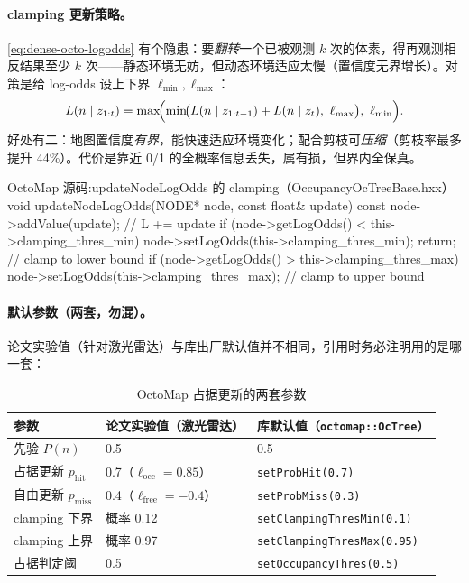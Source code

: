 \paragraph{clamping 更新策略。}
\cref{eq:dense-octo-logodds} 有个隐患：要\emph{翻转}一个已被观测 $k$ 次的体素，得再观测相反结果至少 $k$ 次——静态环境无妨，但动态环境适应太慢（置信度无界增长）。对策是给 log-odds 设上下界 $\ell_{\min},\ell_{\max}$：
\begin{equation}
  L(n\mid z_{1:t})=\max\!\Bigl(\min\!\bigl(L(n\mid z_{1:t-1})+L(n\mid z_t),\ \ell_{\max}\bigr),\ \ell_{\min}\Bigr).
  \label{eq:dense-octo-clamp}
\end{equation}
好处有二：地图置信度\emph{有界}，能快速适应环境变化；配合剪枝可\emph{压缩}（剪枝率最多提升 44\%）。代价是靠近 0/1 的全概率信息丢失，属有损，但界内全保真。

\begin{codebox}[C++]{OctoMap 源码:updateNodeLogOdds 的 clamping（OccupancyOcTreeBase.hxx）}
void updateNodeLogOdds(NODE* node, const float& update) const {
  node->addValue(update);                                 // L += update
  if (node->getLogOdds() < this->clamping_thres_min) {
    node->setLogOdds(this->clamping_thres_min); return;   // clamp to lower bound
  }
  if (node->getLogOdds() > this->clamping_thres_max) {
    node->setLogOdds(this->clamping_thres_max);           // clamp to upper bound
  }
}
\end{codebox}

\paragraph{默认参数（两套，勿混）。}
论文实验值（针对激光雷达）与库出厂默认值并不相同，引用时务必注明用的是哪一套\cite{hornung2013octomap}：

\begin{table}[H]\centering\small
\caption{OctoMap 占据更新的两套参数}
\label{tab:dense-octo-params}
\begin{tabular}{lll}
\toprule
参数 & 论文实验值（激光雷达） & 库默认值（\texttt{octomap::OcTree}） \\
\midrule
先验 $P(n)$ & 0.5 & 0.5 \\
占据更新 $p_{\mathrm{hit}}$ & 0.7（$\ell_{\mathrm{occ}}=0.85$） & \texttt{setProbHit(0.7)} \\
自由更新 $p_{\mathrm{miss}}$ & 0.4（$\ell_{\mathrm{free}}=-0.4$） & \texttt{setProbMiss(0.3)} \\
clamping 下界 & 概率 0.12 & \texttt{setClampingThresMin(0.1)} \\
clamping 上界 & 概率 0.97 & \texttt{setClampingThresMax(0.95)} \\
占据判定阈 & 0.5 & \texttt{setOccupancyThres(0.5)} \\
\bottomrule
\end{tabular}
\end{table}

